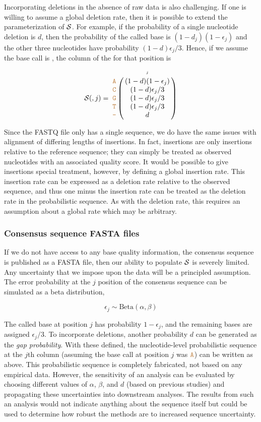 \documentclass[10pt]{article}
\begin{document}
Incorporating deletions in the absence of raw data is also challenging.
If one is willing to assume a global deletion rate, then it is possible to extend the parameterization of $\mathcal{S}$.
For example, if the probability of a single nucleotide deletion is $d$, then the probability of the called base is $(1-d_j)(1-\epsilon_j)$ and the other three nucleotides have probability $(1-d)\epsilon_j/3$.
Hence, if we assume the base call is , the column of the \nlps for that position is
\begin{equation}
\nps(,j) = 
\bordermatrix{
&\scriptscriptstyle{j}  \cr
\sq{A} & (1 - d)(1-\epsilon_j) \cr
\sq{C} & (1 - d)\epsilon_j/3 \cr
\sq{G} & (1 - d)\epsilon_j/3 \cr
\sq{T} & (1 - d)\epsilon_j/3 \cr
\sq{-} & d \cr
}
\label{eq:deletion}
\end{equation}

Since the FASTQ file only has a single sequence, we do have the same issues with alignment of differing lengths of insertions.
In fact, insertions are only insertions relative to the reference sequence; they can simply be treated as observed nucleotides with an associated quality score.
It would be possible to give insertions special treatment, however, by defining a global insertion rate.
This insertion rate can be expressed as a deletion rate relative to the observed sequence, and thus one minus the insertion rate can be treated as the deletion rate in the probabilistic sequence.
As with the deletion rate, this requires an assumption about a global rate which may be arbitrary.


\subsubsection{Consensus sequence FASTA files}


If we do not have access to any base quality information, \eg the consensus sequence is published as a FASTA file, then our ability to populate $\mathcal{S}$ is severely limited.
Any uncertainty that we impose upon the data will be a principled assumption.
The error probability at the $j$ position of the consensus sequence can be simulated as a beta distribution, \ie \vspace{-4mm}

$$
\epsilon_j \sim\text{Beta}(\alpha, \beta)
$$

The called base at position $j$ has probability $1-\epsilon_j$, and the remaining bases are assigned $\epsilon_j/3$.
To incorporate deletions, another probability $d$ can be generated as the \emph{gap probability}.
With these defined, the nucleotide-level probabilistic sequence at the $j$th column (assuming the base call at position $j$ was $\texttt{\textcolor{brown}{A}}$) can be written as above.
This probabilistic sequence is completely fabricated, \ie not based on any empirical data.
However, the sensitivity of an analysis can be evaluated by choosing different values of $\alpha$, $\beta$, and $d$ (\eg based on previous studies) and propagating these uncertainties into downstream analyses.
The results from such an analysis would not indicate anything about the sequence itself but could be used to determine how robust the methods are to increased sequence uncertainty.
\end{document}
